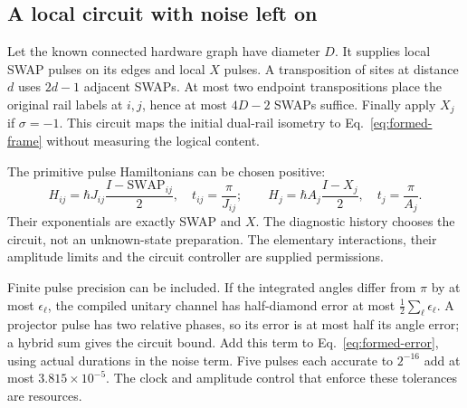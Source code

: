 \documentclass[11pt]{article}
\theoremstyle{definition}
\theoremstyle{remark}
\begin{document}
\subsection{A local circuit with noise left on}

Let the known connected hardware graph have diameter $D$. It supplies local
SWAP pulses on its edges and local $X$ pulses. A transposition of sites at
distance $d$ uses $2d-1$ adjacent SWAPs. At most two endpoint transpositions
place the original rail labels at $i,j$, hence at most $4D-2$ SWAPs suffice.
Finally apply $X_j$ if $\sigma=-1$. This circuit maps the initial dual-rail
isometry to Eq.~\eqref{eq:formed-frame} without measuring the logical content.

The primitive pulse Hamiltonians can be chosen positive:
\begin{equation}\label{eq:formed-gates}
 H_{ij}=\hbar J_{ij}\frac{I-\mathrm{SWAP}_{ij}}2,
 \quad t_{ij}=\frac\pi{J_{ij}};\qquad
 H_j=\hbar A_j\frac{I-X_j}2,
 \quad t_j=\frac\pi{A_j}.
\end{equation}
Their exponentials are exactly SWAP and $X$. The diagnostic history chooses
the circuit, not an unknown-state preparation. The elementary interactions,
their amplitude limits and the circuit controller are supplied permissions.

Finite pulse precision can be included. If the integrated angles differ
from $\pi$ by at most $\epsilon_\ell$, the compiled unitary channel has
half-diamond error at most $\frac12\sum_\ell\epsilon_\ell$. A projector
pulse has two relative phases, so its error is at most half its angle
error; a hybrid sum gives the circuit bound. Add this term to
Eq.~\eqref{eq:formed-error}, using actual durations in the noise term.
Five pulses each accurate to $2^{-16}$ add at most $3.815\times10^{-5}$.
The clock and amplitude control that enforce these tolerances are resources.
\end{document}
